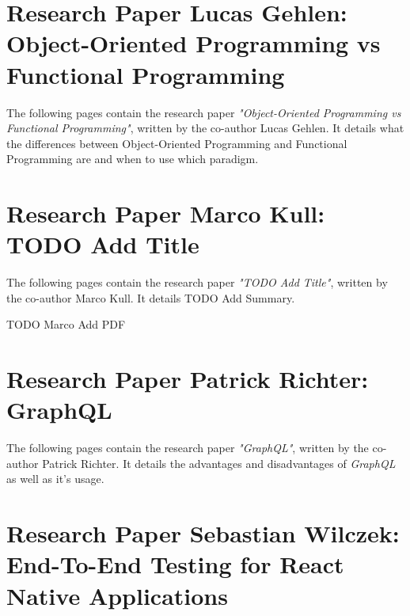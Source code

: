 \patchcmd{\appendices}{\quad}{: }{}{}
\begin{appendices}

\section{Research Paper Lucas Gehlen: Object-Oriented Programming vs Functional Programming}
\label{appendix:research_paper_lucas_gehlen}

The following pages contain the research paper \textit{"Object-Oriented Programming vs Functional Programming"}, written by the co-author Lucas Gehlen. It details what the differences between Object-Oriented Programming and Functional Programming are and when to use which paradigm. 

 

\newpage

\section{Research Paper Marco Kull: TODO Add Title}
\label{appendix:research_paper_marco_kull}

The following pages contain the research paper \textit{"TODO Add Title"}, written by the co-author Marco Kull. It details TODO Add Summary.

TODO Marco Add PDF

\newpage

\section{Research Paper Patrick Richter: GraphQL}
\label{appendix:research_paper_patrick_richter}

The following pages contain the research paper \textit{"GraphQL"}, written by the co-author Patrick Richter. It details the advantages and disadvantages of \textit{GraphQL} as well as it's usage.

 

\newpage

\section{Research Paper Sebastian Wilczek: End-To-End Testing for React Native Applications}
\label{appendix:research_paper_sebastian_wilczek}


\end{appendices}
